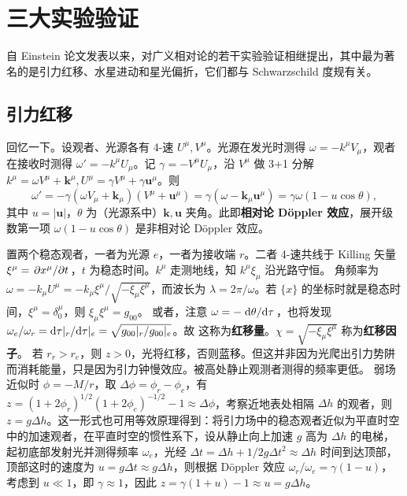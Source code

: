 \section{三大实验验证}

自 Einstein 论文发表以来，对广义相对论的若干实验验证相继提出，其中最为著名的是引力红移、水星进动和星光偏折，它们都与 Schwarzschild 度规有关。

\subsection{引力红移}

回忆一下。设观者、光源各有 4-速 $U^\mu,V^\mu$。光源在发光时测得 $\omega=-k^\mu V_\mu$，观者在接收时测得 $\omega'=-k^\mu U_\mu$。记 $\gamma = - V^\mu U_\mu$，沿 $V^\mu$ 做 3+1 分解 $k^\mu=\omega V^\mu + \bm k^\mu,U^\mu = \gamma V^\mu + \gamma \bm u^\mu$。则
\[\omega'=-\gamma (\omega V_\mu + \bm k_\mu) (V^\mu + \bm u^\mu) = \gamma (\omega - \bm k_\mu \bm u^\mu) = \gamma \omega (1 - u \cos \theta),\]
其中 $u=|\bm u|$，$\theta$ 为（光源系中）$\bm k,\bm u$ 夹角。此即\textbf{相对论 Döppler 效应}，展开级数第一项 $\omega (1 - u \cos \theta)$ 是非相对论 D\"oppler 效应。

置两个稳态观者，一者为光源 $e$，一者为接收端 $r$。二者 4-速共线于 Killing 矢量 $\xi^\mu = \pdv*{x^\mu}{t}$，$t$ 为稳态时间。$k^\mu$ 走测地线，知 $k^\mu\xi_\mu$ 沿光路守恒。
角频率为 $\omega=-k_\mu U^\mu=-k_\mu\xi^\mu/\sqrt{-\xi_\mu \xi^\mu}$，而波长为 $\lambda = 2\pi/\omega$。若 $\{x\}$ 的坐标时就是稳态时间，$\xi^\mu=\delta^\mu_0$，则 $\xi_\mu\xi^\mu=g_{00}$。
或者，注意 $\omega=-\dv*{\theta}{\tau}$，也将发现 $\omega_e/\omega_r=\dd\tau|_r/\dd\tau|_e=\sqrt{g_{00}|_r/g_{00}|_e}$。故
这称为\textbf{红移量}。$\chi = \sqrt{-\xi_\mu\xi^\mu}$ 称为\textbf{红移因子}。
若 $r_r>r_e$，则 $z>0$，光将红移，否则蓝移。但这并非因为光爬出引力势阱而消耗能量，只是因为引力钟慢效应。被高处静止观测者测得的频率更低。
弱场近似时 $\phi=-M/r$，取 $\Delta\phi=\phi_r-\phi_e$，有 $z=(1+2\phi_r)^{1/2}(1+2\phi_e)^{-1/2}-1\approx\Delta\phi$，考察近地表处相隔 $\Delta h$ 的观者，则 $z=g\Delta h$。这一形式也可用等效原理得到：将引力场中的稳态观者近似为平直时空中的加速观者，在平直时空的惯性系下，设从静止向上加速 $g$ 高为 $\Delta h$ 的电梯，起初底部发射光并测得频率 $\omega_e$，光经 $\Delta t=\Delta h + 1/2 g\Delta t^2\approx \Delta h$ 时间到达顶部，顶部这时的速度为 $u=g\Delta t\approx g\Delta h$，则根据 D\"oppler 效应 $\omega_r/\omega_e = \gamma(1-u)$，考虑到 $u\ll 1$，即 $\gamma\approx 1$，因此 $z = \gamma(1+u) - 1 \approx u = g\Delta h$。

